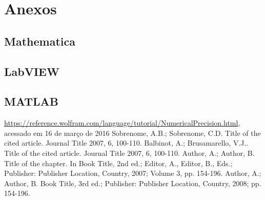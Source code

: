 \documentclass[12pt,a4paper]{instrumentacao}
\begin{document}
\chapter*{Anexos}
\section{Mathematica}

\section{LabVIEW}

\section{MATLAB}

\begin{thebibliography}{9}
 \url{https://reference.wolfram.com/language/tutorial/NumericalPrecision.html}, acessado em 16 de março de 2016
 Sobrenome, A.B.; Sobrenome, C.D. Title of the cited article. Journal Title 2007, 6, 100-110. 
 Balbinot, A.; Brusamarello, V.J.. Title of the cited article. Journal Title 2007, 6, 100-110. 
 Author, A.; Author, B. Title of the chapter. In Book Title, 2nd ed.; Editor, A., Editor, B., Eds.; Publisher: Publisher Location, Country, 2007; Volume 3, pp. 154-196.
 Author, A.; Author, B. Book Title, 3rd ed.; Publisher: Publisher Location, Country, 2008; 
pp. 154-196.

\end{thebibliography}
\end{document}
